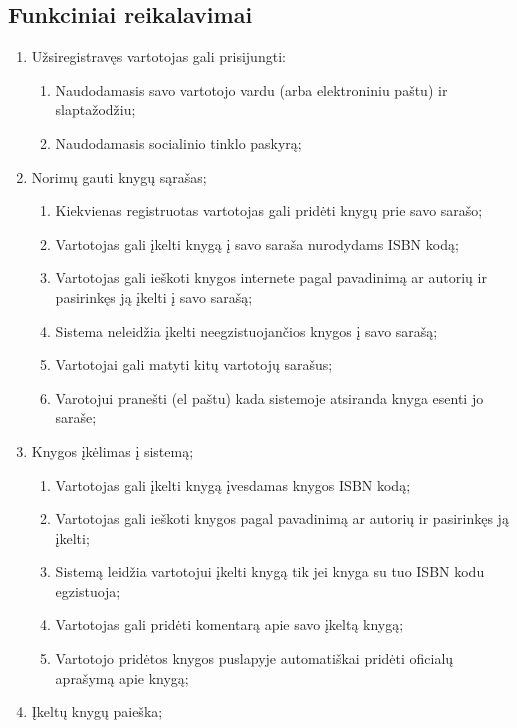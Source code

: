 \documentclass{VUMIFPSkursinis}
\begin{document}
\subsection{Funkciniai reikalavimai}
	\begin{enumerate}[label=\textbf{FR\arabic*}]
		\item Užsiregistravęs vartotojas gali prisijungti:
			\begin{enumerate}[label*=\textbf{.\arabic*}]
				\item Naudodamasis savo vartotojo vardu (arba elektroniniu paštu) ir slaptažodžiu;
				\item Naudodamasis socialinio tinklo paskyrą;
			\end{enumerate}
		\item Norimų gauti knygų sąrašas;
			\begin{enumerate}[label*=\textbf{.\arabic*}]
				\item Kiekvienas registruotas vartotojas gali pridėti knygų prie savo sarašo;
				\item Vartotojas gali įkelti knygą į savo saraša nurodydams ISBN kodą;
				\item Vartotojas gali ieškoti knygos internete pagal pavadinimą ar autorių ir 
					pasirinkęs ją įkelti į savo sarašą;
				\item Sistema neleidžia įkelti neegzistuojančios knygos į savo sarašą;
				\item Vartotojai gali matyti kitų vartotojų sarašus;
				\item Varotojui pranešti (el paštu) kada sistemoje atsiranda knyga esenti jo saraše;
		    \end{enumerate}
		\item Knygos įkėlimas į sistemą;
			\begin{enumerate}[label*=\textbf{.\arabic*}]
				\item Vartotojas gali įkelti knygą įvesdamas knygos ISBN kodą;
				\item Vartotojas gali ieškoti knygos pagal pavadinimą ar autorių ir 
					pasirinkęs ją įkelti;
				\item Sistemą leidžia vartotojui įkelti knygą tik jei knyga su tuo ISBN kodu egzistuoja;
				\item Vartotojas gali pridėti komentarą apie savo įkeltą knygą;
				\item Vartotojo pridėtos knygos puslapyje automatiškai pridėti oficialų aprašymą apie knygą;
			\end{enumerate}
		\item Įkeltų knygų paieška;

\end{enumerate}
\end{document}
